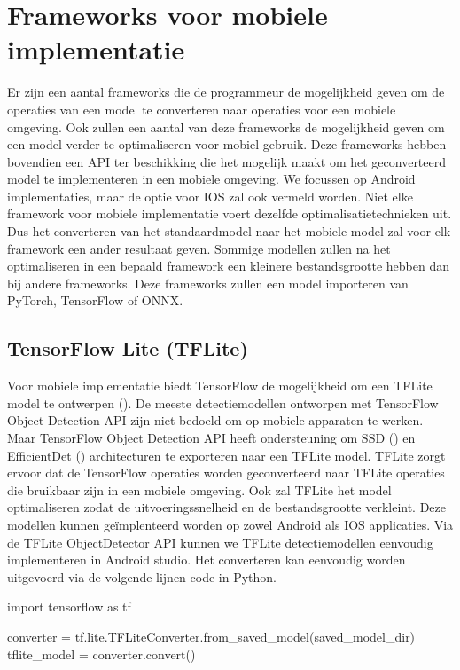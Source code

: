 \section{Frameworks voor mobiele implementatie}
Er zijn een aantal frameworks die de programmeur de mogelijkheid geven om de operaties van een model te converteren naar operaties voor een mobiele omgeving.
Ook zullen een aantal van deze frameworks de mogelijkheid geven om een model verder te optimaliseren voor mobiel gebruik.
Deze frameworks hebben bovendien een API ter beschikking die het mogelijk maakt om het geconverteerd model te implementeren in een mobiele omgeving.
We focussen op Android implementaties, maar de optie voor IOS zal ook vermeld worden.
Niet elke framework voor mobiele implementatie voert dezelfde optimalisatietechnieken uit.
Dus het converteren van het standaardmodel naar het mobiele model zal voor elk framework een ander resultaat geven.
Sommige modellen zullen na het optimaliseren in een bepaald framework een kleinere bestandsgrootte hebben dan bij andere frameworks.
Deze frameworks zullen een model importeren van PyTorch, TensorFlow of ONNX.

\subsection{TensorFlow Lite (TFLite)} \label{tf}
Voor mobiele implementatie biedt TensorFlow de mogelijkheid om een TFLite model te ontwerpen (\cite{tensorflow2015-whitepaper}).
De meeste detectiemodellen ontworpen met TensorFlow Object Detection API zijn niet bedoeld om op mobiele apparaten te werken.
Maar TensorFlow Object Detection API heeft ondersteuning om SSD  (\cite{liu_ssd_2016}) en EfficientDet (\cite{tan_efficientdet_2020}) architecturen te exporteren naar een TFLite model.
%
TFLite zorgt ervoor dat de TensorFlow operaties worden geconverteerd naar TFLite operaties die bruikbaar zijn in een mobiele omgeving.
Ook zal TFLite het model optimaliseren zodat de uitvoeringssnelheid en de bestandsgrootte verkleint.
Deze modellen kunnen ge\"implenteerd worden op zowel Android als IOS applicaties.
Via de TFLite ObjectDetector API kunnen we TFLite detectiemodellen eenvoudig implementeren in Android studio.
Het converteren kan eenvoudig worden uitgevoerd via de volgende lijnen code in Python.

\begin{python}
import tensorflow as tf

converter = tf.lite.TFLiteConverter.from_saved_model(saved_model_dir)
tflite_model = converter.convert()
\end{python}	

